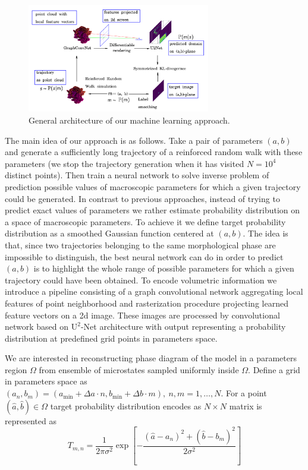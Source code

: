 \documentclass[aps,a4paper,twocolumn,showpacs]{revtex4}
\begin{document}
\begin{figure}[ht]
\includegraphics[width=8cm]{Fig1_rrw_analysis_scheme (2) (1).png}
\caption{General architecture of our machine learning approach.}
\label{scheme}
\end{figure}

% 
The main idea of our approach is as follows. Take a pair of parameters $(a,b)$ and generate a sufficiently long trajectory of a reinforced random walk with these parameters (we stop the trajectory generation when it has visited $N = 10^4$ distinct points). Then train a neural network to solve inverse problem of prediction possible values of macroscopic parameters for which a given trajectory could be generated. In contrast to previous approaches, instead of trying to predict exact values of parameters we rather estimate probability distribution on a space of macroscopic parameters. To achieve it we define target probability distribution as a smoothed Gaussian function centered at $(a,b)$. The idea is that, since two trajectories belonging to the same morphological phase are impossible to distinguish, the best neural network can do in order to predict $(a,b)$ is to highlight the whole range of possible parameters for which a given trajectory could have been obtained. To encode volumetric information we introduce a pipeline consisting of a graph convolutional network aggregating local features of point neighborhood and rasterization procedure projecting learned feature vectors on a 2d image. These images are processed by convolutional network based on $\text{U}^{2}$-Net architecture with output representing a probability distribution at predefined grid points in parameters space.

We are interested in reconstructing phase diagram of the model in a parameters region $\Omega$ from ensemble of microstates sampled uniformly inside $\Omega$. Define a grid in parameters space as  
$(a_{n}, b_{m}) = (a_{\text{min}} + \Delta a \cdot n, b_{\text{min}} + \Delta b \cdot m), \ n, m = 1, \dots, N.$ For a point $(\hat{a}, \hat{b}) \in \Omega$ target probability distribution encodes as $N \times N$ matrix is represented as 
$$
T_{m, n} = \frac{1}{2 \pi \sigma^{2}}\exp\left[-\frac{(\hat{a} - a_{n})^{2}+(\hat{b} - b_{m})^{2}}{2\sigma^{2}}\right]
$$
\end{document}
